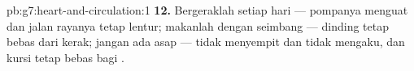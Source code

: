 \begin{solution}{pb:g7:heart-and-circulation:1}
\textbf{12.} Bergeraklah setiap hari --- pompanya menguat dan jalan
rayanya tetap lentur; makanlah dengan seimbang --- dinding 
tetap bebas dari kerak; jangan ada asap ---  tidak
menyempit dan tidak mengaku, dan kursi  tetap bebas bagi
.
\end{solution}
